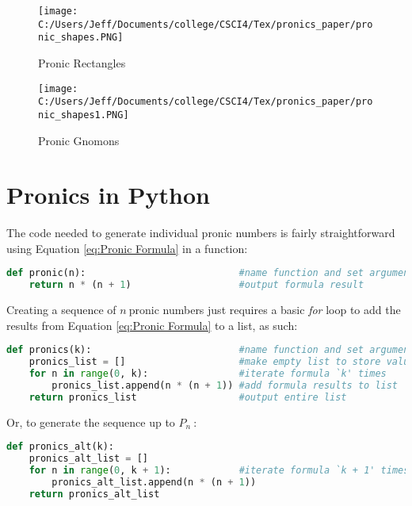 \documentclass[12]{article}
\begin{document}
\begin{figure}[h]
	\centering
	\texttt{[image: C:/Users/Jeff/Documents/college/CSCI4/Tex/pronics\_paper/pronic\_shapes.PNG]}
	\caption{Pronic Rectangles}
	\label{fig:Pronic Rectangles}
\end{figure}

\begin{figure}[h]
	\centering
	\texttt{[image: C:/Users/Jeff/Documents/college/CSCI4/Tex/pronics\_paper/pronic\_shapes1.PNG]}
	\caption{Pronic Gnomons}
	\label{fig:Pronic Rectangles1}
\end{figure}

\section{Pronics in Python}

The code needed to generate individual pronic numbers is fairly straightforward using Equation \ref{eq:Pronic Formula} in a function:

\begin{lstlisting}[style=mycodestyle, language=Python]
def pronic(n):                           #name function and set argument
	return n * (n + 1)                   #output formula result
\end{lstlisting}

Creating a sequence of $ n\ $pronic numbers just requires a basic \textit{for} loop to add the results from Equation \ref{eq:Pronic Formula} to a list, as such:

\begin{lstlisting}[style=mycodestyle, language=Python]
def pronics(k):                          #name function and set argument
	pronics_list = []                    #make empty list to store values
	for n in range(0, k):                #iterate formula `k' times
		pronics_list.append(n * (n + 1)) #add formula results to list
	return pronics_list                  #output entire list
\end{lstlisting}

Or, to generate the sequence up to $ P_{n}\ $:

\begin{lstlisting}[style=mycodestyle, language=Python]
def pronics_alt(k):                   
	pronics_alt_list = []                    
	for n in range(0, k + 1):            #iterate formula `k + 1' times
		pronics_alt_list.append(n * (n + 1)) 
	return pronics_alt_list                  
\end{lstlisting}
\end{document}
